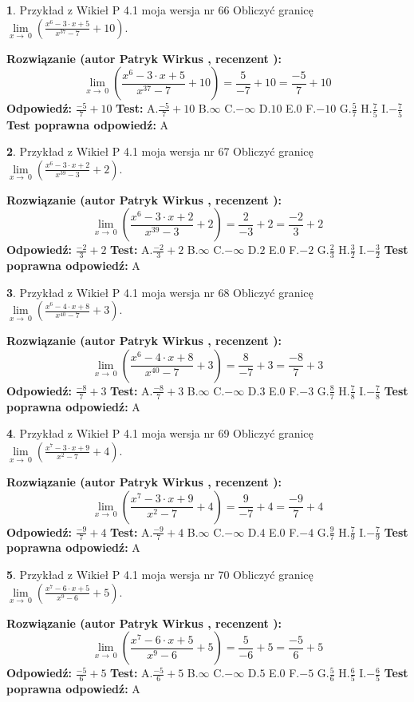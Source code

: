 \documentclass[12pt, a4paper]{article}
\theoremstyle{definition} %
\newtheorem{zad}{}
\newcommand{\zadStart}[1]{\begin{zad}#1\newline}
\newcommand{\zadStop}{\end{zad}}
\newcommand{\rozwStart}[2]{\noindent \textbf{Rozwiązanie (autor #1 , recenzent #2): }\newline}
\newcommand{\rozwStop}{\newline}
\newcommand{\odpStart}{\noindent \textbf{Odpowiedź:}\newline}
\newcommand{\odpStop}{\newline}
\newcommand{\testStart}{\noindent \textbf{Test:}\newline}
\newcommand{\testStop}{\newline}
\newcommand{\kluczStart}{\noindent \textbf{Test poprawna odpowiedź:}\newline}
\newcommand{\kluczStop}{\newline}
\begin{document}
\zadStart{Przykład z Wikieł P 4.1 moja wersja nr 66}
Obliczyć granicę $\lim\limits_{x\to\ 0}(\frac{x^{6}-3 \cdot x +5}{x^{37}-7}+10)$.
\zadStop
\rozwStart{Patryk Wirkus}{}
$$\lim\limits_{x\to\ 0}(\frac{x^{6}-3 \cdot x +5}{x^{37}-7}+10)=\frac{5}{-7}+10=\frac{-5}{7}+10$$
\rozwStop
\odpStart
$\frac{-5}{7}+10$
\odpStop
\testStart
A.$\frac{-5}{7}+10$
B.$\infty$
C.$-\infty$
D.$10$
E.$0$
F.$-10$
G.$\frac{5}{7}$
H.$\frac{7}{5}$
I.$-\frac{7}{5}$
\testStop
\kluczStart
A
\kluczStop



\zadStart{Przykład z Wikieł P 4.1 moja wersja nr 67}
Obliczyć granicę $\lim\limits_{x\to\ 0}(\frac{x^{6}-3 \cdot x +2}{x^{39}-3}+2)$.
\zadStop
\rozwStart{Patryk Wirkus}{}
$$\lim\limits_{x\to\ 0}(\frac{x^{6}-3 \cdot x +2}{x^{39}-3}+2)=\frac{2}{-3}+2=\frac{-2}{3}+2$$
\rozwStop
\odpStart
$\frac{-2}{3}+2$
\odpStop
\testStart
A.$\frac{-2}{3}+2$
B.$\infty$
C.$-\infty$
D.$2$
E.$0$
F.$-2$
G.$\frac{2}{3}$
H.$\frac{3}{2}$
I.$-\frac{3}{2}$
\testStop
\kluczStart
A
\kluczStop



\zadStart{Przykład z Wikieł P 4.1 moja wersja nr 68}
Obliczyć granicę $\lim\limits_{x\to\ 0}(\frac{x^{6}-4 \cdot x +8}{x^{40}-7}+3)$.
\zadStop
\rozwStart{Patryk Wirkus}{}
$$\lim\limits_{x\to\ 0}(\frac{x^{6}-4 \cdot x +8}{x^{40}-7}+3)=\frac{8}{-7}+3=\frac{-8}{7}+3$$
\rozwStop
\odpStart
$\frac{-8}{7}+3$
\odpStop
\testStart
A.$\frac{-8}{7}+3$
B.$\infty$
C.$-\infty$
D.$3$
E.$0$
F.$-3$
G.$\frac{8}{7}$
H.$\frac{7}{8}$
I.$-\frac{7}{8}$
\testStop
\kluczStart
A
\kluczStop



\zadStart{Przykład z Wikieł P 4.1 moja wersja nr 69}
Obliczyć granicę $\lim\limits_{x\to\ 0}(\frac{x^{7}-3 \cdot x +9}{x^{2}-7}+4)$.
\zadStop
\rozwStart{Patryk Wirkus}{}
$$\lim\limits_{x\to\ 0}(\frac{x^{7}-3 \cdot x +9}{x^{2}-7}+4)=\frac{9}{-7}+4=\frac{-9}{7}+4$$
\rozwStop
\odpStart
$\frac{-9}{7}+4$
\odpStop
\testStart
A.$\frac{-9}{7}+4$
B.$\infty$
C.$-\infty$
D.$4$
E.$0$
F.$-4$
G.$\frac{9}{7}$
H.$\frac{7}{9}$
I.$-\frac{7}{9}$
\testStop
\kluczStart
A
\kluczStop



\zadStart{Przykład z Wikieł P 4.1 moja wersja nr 70}
Obliczyć granicę $\lim\limits_{x\to\ 0}(\frac{x^{7}-6 \cdot x +5}{x^{9}-6}+5)$.
\zadStop
\rozwStart{Patryk Wirkus}{}
$$\lim\limits_{x\to\ 0}(\frac{x^{7}-6 \cdot x +5}{x^{9}-6}+5)=\frac{5}{-6}+5=\frac{-5}{6}+5$$
\rozwStop
\odpStart
$\frac{-5}{6}+5$
\odpStop
\testStart
A.$\frac{-5}{6}+5$
B.$\infty$
C.$-\infty$
D.$5$
E.$0$
F.$-5$
G.$\frac{5}{6}$
H.$\frac{6}{5}$
I.$-\frac{6}{5}$
\testStop
\kluczStart
A
\kluczStop
\end{document}
